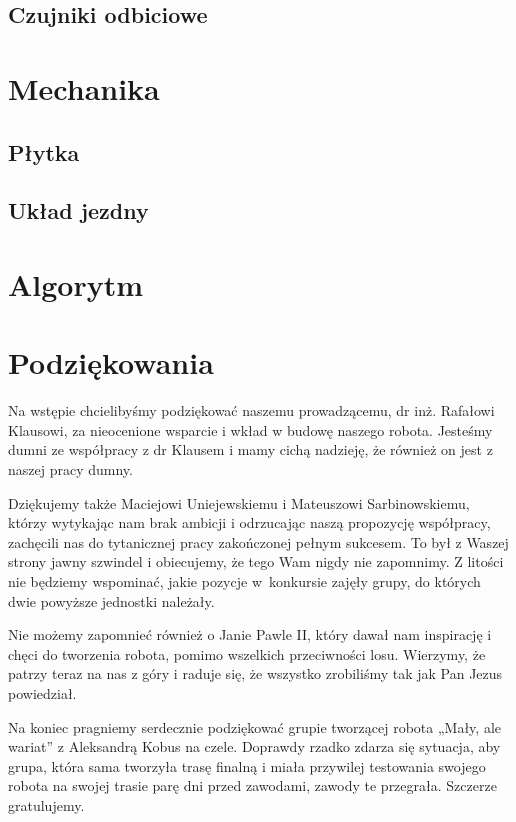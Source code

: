 \documentclass{article}
\begin{document}
\subsection{Czujniki odbiciowe}


\section{Mechanika}

\subsection{Płytka}


\subsection{Układ jezdny}


\section{Algorytm}


\section{Podziękowania}

Na wstępie chcielibyśmy podziękować naszemu prowadzącemu, dr inż. Rafałowi Klausowi,  za nieocenione wsparcie i wkład w budowę naszego robota. Jesteśmy dumni ze współpracy z dr Klausem i mamy cichą nadzieję, że również on jest z naszej pracy dumny.

Dziękujemy także Maciejowi Uniejewskiemu i Mateuszowi Sarbinowskiemu, którzy wytykając nam brak ambicji i odrzucając naszą propozycję współpracy, zachęcili nas do tytanicznej pracy zakończonej pełnym sukcesem. To był z Waszej strony jawny szwindel i obiecujemy, że tego Wam nigdy nie zapomnimy. Z litości nie będziemy wspominać, jakie pozycje w~konkursie zajęły grupy, do których dwie powyższe jednostki należały.

Nie możemy zapomnieć również o Janie Pawle II, który dawał nam inspirację i chęci do tworzenia robota, pomimo wszelkich przeciwności losu. Wierzymy, że patrzy teraz na nas z góry i raduje się, że wszystko zrobiliśmy tak jak Pan Jezus powiedział.

Na koniec pragniemy serdecznie podziękować grupie tworzącej robota „Mały, ale wariat” z Aleksandrą Kobus na czele. Doprawdy rzadko zdarza się sytuacja, aby grupa, która sama tworzyła trasę finalną i miała przywilej testowania swojego robota na swojej trasie parę dni przed zawodami, zawody te przegrała. Szczerze gratulujemy.
\end{document}
